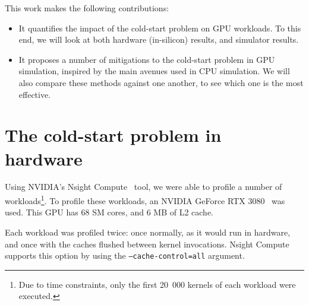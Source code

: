 \documentclass[5p,numvwe]{elsarticle}
\begin{document}
    This work makes the following contributions:
    \begin{itemize}
        \item It quantifies the impact of the cold-start problem on GPU workloads.
        To this end, we will look at both hardware (in-silicon) results, and simulator results.
        \item It proposes a number of mitigations to the cold-start problem in GPU simulation, inspired by the main avenues used in CPU simulation.
        We will also compare these methods against one another, to see which one is the most effective.
    \end{itemize}

    \section{The cold-start problem in hardware}\label{sec:hw}
    Using NVIDIA's Nsight Compute~\cite{nsight} tool, we were able to profile a number of workloads\footnote{Due to time constraints, only the first 20\ 000 kernels of each workload were executed.}.
    To profile these workloads, an NVIDIA GeForce RTX 3080~\cite{nvidia-wp} was used.
    This GPU has 68 SM cores, and 6 MB of L2 cache.

    Each workload was profiled twice: once normally, as it would run in hardware, and once with the caches flushed between kernel invocations.
    Nsight Compute supports this option by using the \texttt{--cache-control=all} argument.
\end{document}
